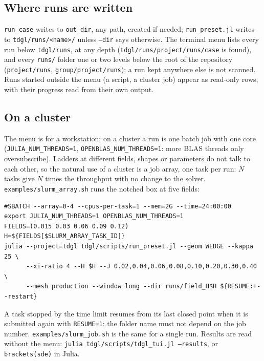 \documentclass[11pt,a4paper]{article}
\newcommand{\code}[1]{\texttt{#1}}
\begin{document}
\subsection{Where runs are written}

\code{run\_case} writes to \code{out\_dir}, any path, created if needed;
\code{run\_preset.jl} writes to \code{tdgl/runs/<name>/} unless \code{--dir}
says otherwise. The terminal menu lists every run below \code{tdgl/runs}, at
any depth (\code{tdgl/runs/project/runs/case} is found), and every
\code{runs/} folder one or two levels below the root of the repository
(\code{project/runs}, \code{group/project/runs}); a run kept anywhere else is
not scanned. Runs started outside the menu (a script, a cluster job) appear
as read-only rows, with their progress read from their own output.

\subsection{On a cluster}

The menu is for a workstation; on a cluster a run is one batch job with one
core (\code{JULIA\_NUM\_THREADS=1}, \code{OPENBLAS\_NUM\_THREADS=1}: more BLAS
threads only oversubscribe). Ladders at different fields, shapes or
parameters do not talk to each other, so the natural use of a cluster is a
job array, one task per run: $N$ tasks give $N$ times the throughput with no
change to the solver.
\code{examples/slurm\_array.sh} runs the notched box at five fields:
\begin{verbatim}
#SBATCH --array=0-4 --cpus-per-task=1 --mem=2G --time=24:00:00
export JULIA_NUM_THREADS=1 OPENBLAS_NUM_THREADS=1
FIELDS=(0.015 0.03 0.06 0.09 0.12)
H=${FIELDS[$SLURM_ARRAY_TASK_ID]}
julia --project=tdgl tdgl/scripts/run_preset.jl --geom WEDGE --kappa 25 \
      --xi-ratio 4 --H $H --J 0.02,0.04,0.06,0.08,0.10,0.20,0.30,0.40 \
      --mesh production --window long --dir runs/field_H$H ${RESUME:+--restart}
\end{verbatim}
A task stopped by the time limit resumes from its last closed point when it is
submitted again with \code{RESUME=1}: the folder name must not depend on the
job number. \code{examples/slurm\_job.sh} is the same for a single run.
Results are read without the menu: \code{julia tdgl/scripts/tdgl\_tui.jl
--results}, or \code{brackets(sde)} in Julia.
\end{document}
